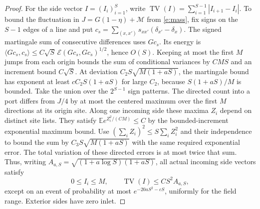 \documentclass[11pt]{amsart}
\newcommand{\E}{\mathbb E}
\newcommand{\1}{\mathbf 1}
\newcommand{\calE}{\mathcal E}
\newcommand{\TV}{\operatorname{TV}}
\begin{document}
\begin{proof}
For the side vector \(I=(I_i)_{i=1}^S\), write \(\TV(I)=\sum_{i=1}^{S-1}|I_{i+1}-I_i|\). To bound the fluctuation in \(J=G(1-\eta)+\mathcal M\) from \eqref{e:mass}, fix signs on the \(S-1\) edges of a line and put \(c_s=\sum_{(x,x')}s_{xx'}(\delta_{x'}-\delta_x)\). The signed martingale sum of consecutive differences uses \(G c_s\). Its energy is \(\langle Gc_s,c_s\rangle\le C\sqrt S\,\calE(Gc_s,Gc_s)^{1/2}\), hence \(O(S)\). Keeping at most the first \(M\) jumps from each origin bounds the sum of conditional variances by \(CMS\) and an increment bound \(C\sqrt S\). At deviation \(C_2 S\sqrt{M(1+aS)}\), the martingale bound has exponent at least \(c C_2 S(1+aS)\) for large \(C_2\), because \(S(1+aS)/M\) is bounded. Take the union over the \(2^{S-1}\) sign patterns. The directed count into a port differs from \(J/4\) by at most the centered maximum over the first \(M\) directions at its origin site. Along one incoming side these maxima \(Z_i\) depend on distinct site lists. They satisfy \(\E e^{Z_i^2/(C M)}\le C\) by the bounded-increment exponential maximum bound. Use \((\sum_i Z_i)^2\le S\sum_i Z_i^2\) and their independence to bound the sum by \(C_3 S\sqrt{M(1+aS)}\) with the same required exponential error. The total variation of these directed errors is at most twice that sum. Thus, writing \(A_{a,S}=\sqrt{(1+a\log S)(1+aS)}\), all actual incoming side vectors satisfy
\begin{equation}\label{e:variation}
 0\le I_i\le M,\qquad \TV(I)\le CS^2 A_{a,S},
\end{equation}
except on an event of probability at most \(e^{-20aS^2-cS}\), uniformly for the field range. Exterior sides have zero inlet.


\end{proof}
\end{document}
